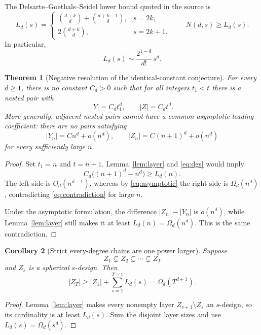 \documentclass[11pt]{article}
\newtheorem{theorem}{Theorem}[section]
\newtheorem{corollary}[theorem]{Corollary}
\begin{document}
The Delsarte--Goethals--Seidel lower bound quoted in the source
\cite{DGS} is
\begin{equation}\label{eq:dgs}
 L_d(s)=
 \begin{cases}
 \displaystyle\binom{d+k}{d}+\binom{d+k-1}{d},&s=2k,\\[6pt]
 \displaystyle2\binom{d+k}{d},&s=2k+1,
 \end{cases}
 \qquad N(d,s)\geq L_d(s).
\end{equation}
In particular,
\begin{equation}\label{eq:asymptotic}
 L_d(s)\sim \frac{2^{1-d}}{d!}\,s^d.
\end{equation}

\begin{theorem}[Negative resolution of the identical-constant conjecture]
\label{thm:negative}
For every $d\geq1$, there is no constant $C_d>0$ such that for all integers
$t_1<t$ there is a nested pair with
\[
 |Y|=C_dt_1^d,
 \qquad |Z|=C_dt^d.
\]
More generally, adjacent nested pairs cannot have a common asymptotic leading
coefficient: there are no pairs satisfying
\[
 |Y_n|=Cn^d+o(n^d),
 \qquad |Z_n|=C(n+1)^d+o(n^d)
\]
for every sufficiently large $n$.
\end{theorem}
\begin{proof}
Set $t_1=n$ and $t=n+1$.  Lemma~\ref{lem:layer} and
\eqref{eq:dgs} would imply
\begin{equation}\label{eq:contradiction}
 C_d\bigl((n+1)^d-n^d\bigr)\geq L_d(n).
\end{equation}
The left side is $O_d(n^{d-1})$, whereas by \eqref{eq:asymptotic} the right
side is $\Omega_d(n^d)$, contradicting \eqref{eq:contradiction} for large
$n$.

Under the asymptotic formulation, the difference $|Z_n|-|Y_n|$ is
$o(n^d)$, while Lemma~\ref{lem:layer} still makes it at least
$L_d(n)=\Omega_d(n^d)$.  This is the same contradiction.
\end{proof}

\begin{corollary}[Strict every-degree chains are one power larger]
\label{cor:chain}
Suppose
\[
 Z_1\subsetneq Z_2\subsetneq\cdots\subsetneq Z_T
\]
and $Z_s$ is a spherical $s$-design.  Then
\[
 |Z_T|\geq |Z_1|+\sum_{s=1}^{T-1}L_d(s)
 =\Omega_d(T^{d+1}).
\]
\end{corollary}
\begin{proof}
Lemma~\ref{lem:layer} makes every nonempty layer
$Z_{s+1}\setminus Z_s$ an $s$-design, so its cardinality is at least
$L_d(s)$.  Sum the disjoint layer sizes and use
$L_d(s)=\Omega_d(s^d)$.
\end{proof}
\end{document}

